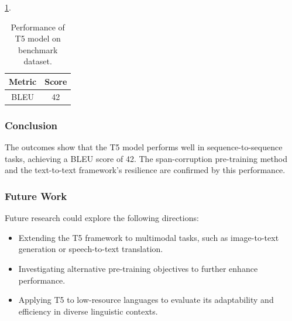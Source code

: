 \documentclass{dhbenelux}
\begin{document}
 \ref{tab:bleu_results}.

\begin{table}[h!]
\centering
\begin{tabular}{|c|c|}
\hline
\textbf{Metric} & \textbf{Score} \\
\hline
BLEU & 42 \\
\hline
\end{tabular}
\caption{Performance of T5 model on benchmark dataset.}
\label{tab:bleu_results}
\end{table}

\subsubsection{Conclusion}
The outcomes show that the T5 model performs well in sequence-to-sequence tasks, achieving a BLEU score of 42. The span-corruption pre-training method and the text-to-text framework's resilience are confirmed by this performance.


\subsubsection{Future Work}
Future research could explore the following directions:
\begin{itemize}
    \item Extending the T5 framework to multimodal tasks, such as image-to-text generation or speech-to-text translation.
    \item Investigating alternative pre-training objectives to further enhance performance.
    \item Applying T5 to low-resource languages to evaluate its adaptability and efficiency in diverse linguistic contexts.
\end{itemize}



%
%
%
%
%
\end{document}
